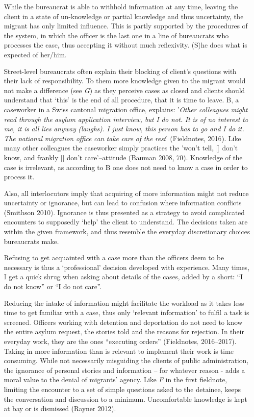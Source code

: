 \par
While the bureaucrat is able to withhold information at any time, leaving the client in a state of un-knowledge or partial knowledge and thus uncertainty, the migrant has only limited influence. This is partly supported by the procedures of the system, in which the officer is the last one in a line of bureaucrats who processes the case, thus accepting it without much reflexivity. (S)he does what is expected of her/him.
\par
Street-level bureaucrats often explain their blocking of client’s questions with their lack of responsibility. To them more knowledge given to the migrant would not make a difference (see \emph{G}) as they perceive cases as closed and clients should understand that ‘this’ is the end of all procedure, that it is time to leave. B, a caseworker in a Swiss cantonal migration office, explains: '\textit{Other colleagues might read through the asylum application interview, but I do not. It is of no interest to me, it is all lies anyway (laughs). I just know, this person has to go and I do it. The national migration office can take care of the rest}' (Fieldnotes, 2016). Like many other colleagues the caseworker simply practices the 'won’t tell, [\textellipsis] don’t know, and frankly [\textellipsis] don’t care'--attitude (Bauman 2008, 70). Knowledge of the case is irrelevant, as according to B one does not need to know a case in order to process it. 
\par
Also, all interlocutors imply that acquiring of more information might not reduce uncertainty or ignorance, but can lead to confusion where information conflicts (Smithson 2010). Ignorance is thus presented as a strategy to avoid complicated encounters to supposedly ‘help’ the client to understand. The decisions taken are within the given framework, and thus resemble the everyday discretionary choices bureaucrats make.
\par
Refusing to get acquainted with a case more than the officers deem to be necessary is thus a ‘professional’ decision developed with experience. Many times, I get a quick shrug when asking about details of the cases, added by a short: \enquote{I do not know} or \enquote{I do not care}.
\par
Reducing the intake of information might facilitate the workload as it takes less time to get familiar with a case, thus only ‘relevant information’ to fulfil a task is screened. Officers working with detention and deportation do not need to know the entire asylum request, the stories told and the reasons for rejection. In their everyday work, they are the ones \enquote{executing orders} (Fieldnotes, 2016--2017). Taking in more information than is relevant to implement their work is time consuming. While not necessarily misguiding the clients of public administration, the ignorance of personal stories and information – for whatever reason - adds a moral value to the denial of migrants’ agency. Like \textit{F} in the first fieldnote, limiting the encounter to a set of simple questions asked to the detainee, keeps the conversation and discussion to a minimum. Uncomfortable knowledge is kept at bay or is dismissed (Rayner 2012).
